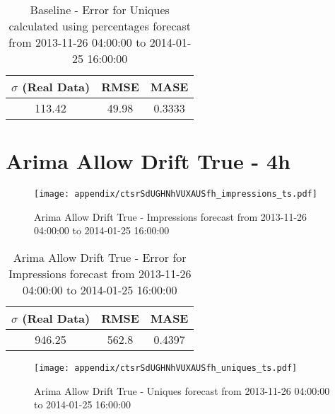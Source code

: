 \begin{table}[H]
\centering
\footnotesize
\begin{tabular}{ccc}
$\sigma$ (Real Data) & RMSE & MASE   \\ \hline
113.42 & 49.98 & 0.3333 \\
\end{tabular}

\vspace{0.5cm}

\caption[]{
Baseline - Error for Uniques calculated using percentages forecast from 2013-11-26 04:00:00 to 2014-01-25 16:00:00}
\end{table}

\section{Arima Allow Drift True - 4h}
\begin{figure}[H] \begin{center} \leavevmode
\texttt{[image: appendix/ctsrSdUGHNhVUXAUSfh\_impressions\_ts.pdf]} \caption[]{
Arima Allow Drift True - Impressions forecast from 2013-11-26 04:00:00 to 2014-01-25 16:00:00} \label{fig:appendix/ctsrSdUGHNhVUXAUSfh_impressions_ts.pdf} \end{center}
\end{figure}

\begin{table}[H]
\centering
\footnotesize
\begin{tabular}{ccc}
$\sigma$ (Real Data) & RMSE & MASE   \\ \hline
946.25 & 562.8 & 0.4397 \\
\end{tabular}

\vspace{0.5cm}

\caption[]{
Arima Allow Drift True - Error for Impressions forecast from 2013-11-26 04:00:00 to 2014-01-25 16:00:00}
\end{table}

\begin{figure}[H] \begin{center} \leavevmode
\texttt{[image: appendix/ctsrSdUGHNhVUXAUSfh\_uniques\_ts.pdf]} \caption[]{
Arima Allow Drift True - Uniques forecast from 2013-11-26 04:00:00 to 2014-01-25 16:00:00} \label{fig:appendix/ctsrSdUGHNhVUXAUSfh_uniques_ts.pdf} \end{center}
\end{figure}

